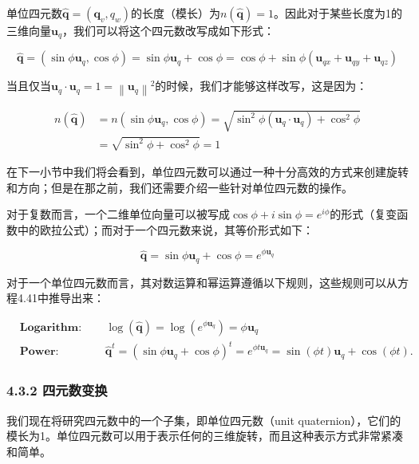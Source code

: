 \documentclass[
  paper=a4,
  ,captions=tableheading
]{scrartcl}
\begin{document}
单位四元数\(\hat{\mathbf{q}}=\left(\mathbf{q}_{v}, q_{w}\right)\)的长度（模长）为\(n\left(\hat{\mathbf{q}}\right)=1\)。因此对于某些长度为1的三维向量\(\mathbf{u}_{q}\)，我们可以将这个四元数改写成如下形式：

\[
  \hat{\mathbf{q}}=\left(\sin \phi \mathbf{u}_{q}, \cos \phi\right)=\sin \phi \mathbf{u}_{q}+\cos \phi =
  \cos \phi + \sin \phi(\mathbf{u}_{qx} + \mathbf{u}_{qy} + \mathbf{u}_{qz})
  \tag{4.39}
\]

当且仅当\(\mathbf{u}_{q} \cdot \mathbf{u}_{q}=1=\left\|\mathbf{u}_{q}\right\|^{2}\)的时候，我们才能够这样改写，这是因为：

\[
  \begin{aligned} n(\hat{\mathbf{q}}) &=n\left(\sin \phi \mathbf{u}_{q}, \cos \phi\right)=\sqrt{\sin ^{2} \phi\left(\mathbf{u}_{q} \cdot \mathbf{u}_{q}\right)+\cos ^{2} \phi} \\ &=\sqrt{\sin ^{2} \phi+\cos ^{2} \phi}=1 \end{aligned} \tag{4.40}
\]

在下一小节中我们将会看到，单位四元数可以通过一种十分高效的方式来创建旋转和方向；但是在那之前，我们还需要介绍一些针对单位四元数的操作。

对于复数而言，一个二维单位向量可以被写成\(\cos \phi + i\sin \phi = e^{i \phi}\)的形式（复变函数中的欧拉公式）；而对于一个四元数来说，其等价形式如下：

\[
  \hat{\mathbf{q}}=\sin \phi \mathbf{u}_{q}+\cos \phi=e^{\phi \mathbf{u}_{q}}
  \tag{4.41}
\]

对于一个单位四元数而言，其对数运算和幂运算遵循以下规则，这些规则可以从方程4.41中推导出来：

\[
  \begin{aligned}{}
     & \mathbf{ Logarithm:}  \qquad  \log (\hat{\mathbf{q}})=\log \left(e^{\phi \mathbf{u}_{q}}\right)=\phi \mathbf{u}_{q}                                                             \\[3mm]
     & \mathbf{Power: } \qquad  \qquad  \hat{\mathbf{q}}^{t}=\left(\sin \phi \mathbf{u}_{q}+\cos \phi\right)^{t}=e^{\phi t \mathbf{u}_{q}}=\sin (\phi t) \mathbf{u}_{q}+\cos (\phi t).
  \end{aligned} \tag{4.42}
\]

\subsubsection{4.3.2 四元数变换}\label{ux56dbux5143ux6570ux53d8ux6362}

我们现在将研究四元数中的一个子集，即单位四元数（unit
quaternion），它们的模长为1。单位四元数可以用于表示任何的三维旋转，而且这种表示方式非常紧凑和简单。
\end{document}
